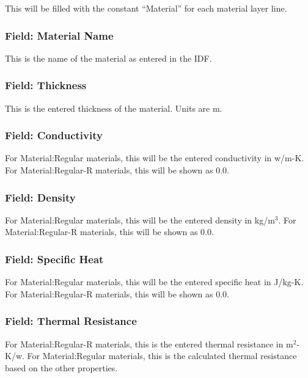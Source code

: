 This will be filled with the constant ``Material'' for each material layer line.

\subsubsection{Field: Material Name}\label{field-material-name}

This is the name of the material as entered in the IDF.

\subsubsection{Field: Thickness}\label{field-thickness}

This is the entered thickness of the material. Units are m.

\subsubsection{Field: Conductivity}\label{field-conductivity}

For Material:Regular materials, this will be the entered conductivity in w/m-K. For Material:Regular-R materials, this will be shown as 0.0.

\subsubsection{Field: Density}\label{field-density}

For Material:Regular materials, this will be the entered density in kg/m\(^{3}\). For Material:Regular-R materials, this will be shown as 0.0.

\subsubsection{Field: Specific Heat}\label{field-specific-heat}

For Material:Regular materials, this will be the entered specific heat in J/kg-K. For Material:Regular-R materials, this will be shown as 0.0.

\subsubsection{Field: Thermal Resistance}\label{field-thermal-resistance}

For Material:Regular-R materials, this is the entered thermal resistance in m\(^{2}\)-K/w. For Material:Regular materials, this is the calculated thermal resistance based on the other properties.

